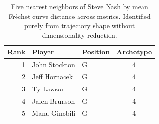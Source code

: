 \begin{table}[htbp]
  \centering\small
  \begin{tabular}{rllc}
    \toprule
    Rank & Player & Position & Archetype \\
    \midrule
    1 & John Stockton & G & 4 \\
    2 & Jeff Hornacek & G & 4 \\
    3 & Ty Lawson & G & 4 \\
    4 & Jalen Brunson & G & 4 \\
    5 & Manu Ginobili & G & 4 \\
    \bottomrule
  \end{tabular}
  \caption{Five nearest neighbors of Steve Nash by mean Fr\'{e}chet curve distance across metrics. Identified purely from trajectory shape without dimensionality reduction.}
  \label{tab:Steve_Nash_frechet_curve_neighbors}
\end{table}

